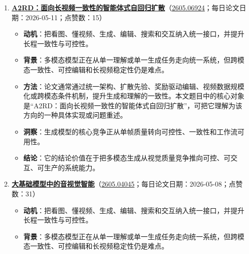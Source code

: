 \begin{enumerate}[leftmargin=1.5em]
\begin{itemize}[leftmargin=1.5em]
    \item \textbf{背景}：多模态模型正在从单一理解或单一生成任务走向统一系统，但跨模态一致性、可控编辑和长视频稳定性仍是难点。
    \item \textbf{方法}：论文通常通过统一架构、扩散先验、奖励驱动编辑、视频数据规模化或跨模态条件机制，提升生成和理解的一致性。本文题目中的核心对象是“4DThinker：用 4D 影像进行动态空间理解”，可把它理解为该方向的一种具体实现或问题重述。
    \item \textbf{洞察}：真正有用的世界模型必须同时回答状态会如何变化、动作是否可行以及失败风险在哪里。
    \item \textbf{结论}：它的结论价值在于把多模态生成从视觉质量竞争推向可控、可交互、可生产的系统能力。
  \end{itemize}
  \item \textbf{\href{https://huggingface.co/papers/2605.06924}{A2RD：面向长视频一致性的智能体式自回归扩散}}（\href{https://arxiv.org/abs/2605.06924}{2605.06924}；每日论文日期：2026-05-11；点赞数：15）
  \begin{itemize}[leftmargin=1.5em]
    \item \textbf{动机}：把看图、懂视频、生成、编辑、搜索和交互纳入统一接口，并提升长程一致性与可控性。
    \item \textbf{背景}：多模态模型正在从单一理解或单一生成任务走向统一系统，但跨模态一致性、可控编辑和长视频稳定性仍是难点。
    \item \textbf{方法}：论文通常通过统一架构、扩散先验、奖励驱动编辑、视频数据规模化或跨模态条件机制，提升生成和理解的一致性。本文题目中的核心对象是“A2RD：面向长视频一致性的智能体式自回归扩散”，可把它理解为该方向的一种具体实现或问题重述。
    \item \textbf{洞察}：生成模型的核心竞争正从单帧质量转向可控性、一致性和工作流可用性。
    \item \textbf{结论}：它的结论价值在于把多模态生成从视觉质量竞争推向可控、可交互、可生产的系统能力。
  \end{itemize}
  \item \textbf{\href{https://huggingface.co/papers/2605.04045}{大基础模型中的音视觉智能}}（\href{https://arxiv.org/abs/2605.04045}{2605.04045}；每日论文日期：2026-05-08；点赞数：31）
  \begin{itemize}[leftmargin=1.5em]
    \item \textbf{动机}：把看图、懂视频、生成、编辑、搜索和交互纳入统一接口，并提升长程一致性与可控性。
    \item \textbf{背景}：多模态模型正在从单一理解或单一生成任务走向统一系统，但跨模态一致性、可控编辑和长视频稳定性仍是难点。

\end{itemize}
\end{enumerate}
